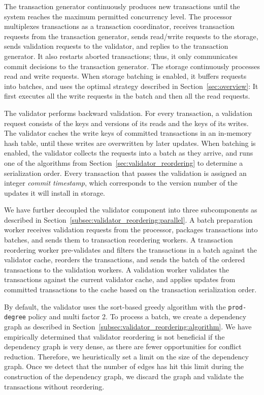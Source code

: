 The transaction generator continuously produces new transactions until the system reaches the maximum permitted concurrency level. The processor multiplexes transactions as a transaction coordinator, receives transaction requests from the transaction generator, sends read/write requests to the storage, sends validation requests to the validator, and replies to the transaction generator. It also restarts aborted transactions; thus, it only communicates commit decisions to the transaction generator. 
The storage continuously processes read and write requests. When storage batching is enabled, it buffers requests into batches, and uses the optimal strategy described in Section~\ref{sec:overview}: It first executes all the write requests in the batch  and then all the read requests. 

The validator performs backward validation. For every transaction, a validation request consists of the keys and versions of its reads and the keys of its writes. The validator caches the write keys of committed transactions in an in-memory hash table, until these writes are overwritten by later updates. When batching is enabled, the validator collects the requests into a batch as they arrive, and runs one of the algorithms from Section~\ref{sec:validator_reordering} to determine a serialization order. Every transaction that passes the validation is assigned an integer \emph{commit timestamp}, which corresponds to the version number of the updates it will install in storage. 

We have further decoupled the validator component into three subcomponents as described in Section~\ref{subsec:validator_reordering:parallel}. A batch preparation worker receives validation requests from the processor, packages transactions into batches, and sends them to transaction reordering workers. A transaction reordering worker pre-validates and filters the transactions in a batch against the validator cache, reorders the transactions, and sends the batch of the ordered transactions to the validation workers. A validation worker validates the transactions against the current validator cache, and applies updates from committed transactions to the cache based on the transaction serialization order. 

By default, the validator uses the sort-based greedy algorithm with the \texttt{prod-degree} policy and multi factor 2. To process a batch, we create a dependency graph as described in Section~\ref{subsec:validator_reordering:algorithm}. We have empirically determined that validator reordering is not beneficial if the dependency graph is very dense, as there are fewer opportunities for conflict reduction. Therefore, we heuristically set a limit on the size of the dependency graph. Once we detect that the number of edges has hit this limit during the construction of the dependency graph, we discard the graph and validate the transactions without reordering. 

